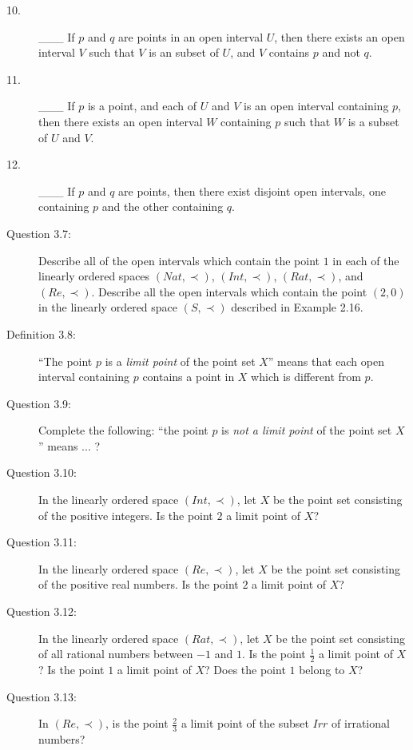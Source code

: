 \documentclass{book}
\begin{document}
\begin{description}
\item[10.] \_\_\_ If $p$ and $q$ are points in an open interval $U$, then there exists an open interval $V$ such that $V$ is an subset of $U$, and $V$ contains $p$ and not $q$.

\item[11.] \_\_\_ If $p$ is a point, and each of $U$ and $V$ is an open interval containing $p$, then there exists an open interval $W$ containing $p$ such that $W$ is a subset of $U$ and $V$.

\item[12.] \_\_\_ If $p$ and $q$ are points, then there exist disjoint open intervals, one containing $p$ and the other containing $q$.

\item[Question 3.7:] Describe all of the open intervals which contain the point $1$ in each of the linearly ordered spaces $(Nat, \prec)$, $(Int, \prec)$, $(Rat, \prec)$, and $(Re, \prec)$. Describe all the open intervals which contain the point $(2,0)$ in the linearly ordered space $(S, \prec)$ described in Example 2.16.

\item[Definition 3.8:] ``The point $p$ is a \emph{limit point} of the point set $X$'' means that each open interval containing $p$ contains a point in $X$ which is different from $p$.

\item[Question 3.9:] Complete the following: ``the point $p$ is \emph{not a limit point} of the point set $X$'' means ... ?

\item[Question 3.10:] In the linearly ordered space $(Int, \prec)$, let $X$ be the point set consisting of the positive integers. Is the point $2$ a limit point of $X$?

\item[Question 3.11:] In the linearly ordered space $(Re, \prec)$, let $X$ be the point set consisting of the positive real numbers. Is the point $2$ a limit point of $X$?

\item[Question 3.12:] In the linearly ordered space $(Rat, \prec)$, let $X$ be the point set consisting of all rational numbers between $-1$ and $1$. Is the point $\frac{1}{2}$ a limit point of $X$? Is the point $1$ a limit point of $X$? Does the point $1$ belong to $X$?

\item[Question 3.13:] In $(Re, \prec)$, is the point $\frac{2}{3}$ a limit point of the subset $Irr$ of irrational numbers?


\end{description}
\end{document}
